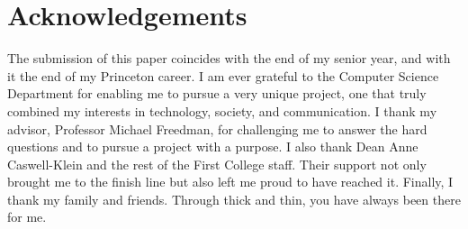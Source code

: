 \section*{Acknowledgements}

The submission of this paper coincides with the end of my senior year, and with it the end of my Princeton career. I am ever grateful to the Computer Science Department for enabling me to pursue a very unique project, one that truly combined my interests in technology, society, and communication. I thank my advisor, Professor Michael Freedman, for challenging me to answer the hard questions and to pursue a project with a purpose. I also thank Dean Anne Caswell-Klein and the rest of the First College staff. Their support not only brought me to the finish line but also left me proud to have reached it. Finally, I thank my family and friends. Through thick and thin, you have always been there for me.

